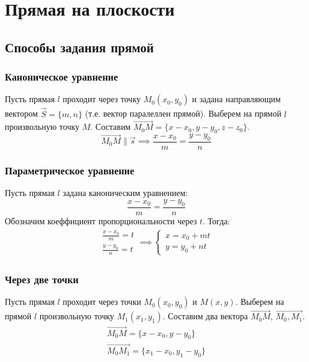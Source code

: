 \section{Прямая на плоскости}

\subsection{Способы задания прямой}

\subsubsection{Каноническое уравнение}

Пусть прямая $l$ проходит через точку $M_0(x_0, y_0)$ и задана направляющим вектором $\vec{S} = \{m, n\}$ (т.е. вектор паралеллен прямой). Выберем на прямой $l$ произвольную точку $M$.
Составим $\overrightarrow{M_0M} = \{x - x_0, y - y_0, z - z_0\}$. 
\[
  \overrightarrow{M_0M} \parallel \vec{s} \implies \boxed{\frac{x - x_0}{m} = \frac{y - y_0}{n}}
\]

\subsubsection{Параметрическое уравнение}

Пусть прямая $l$ задана каноническим уравнением: \[
\frac{x - x_0}{m} = \frac{y - y_0}{n}
\] 
Обозначим коеффициент пропорциональности через $t$. Тогда:
\begin{gather*}
  \begin{matrix}
    \frac{x - x_0}{m} = t \\
    \frac{y - y_0}{n} = t
  \end{matrix} \implies \boxed{\begin{cases}
    x = x_0 + mt \\
    y = y_0 + nt
  \end{cases}}
\end{gather*}
 
\subsubsection{Через две точки}

Пусть прямая $l$ проходит через точки $M_0(x_0, y_0)$ и $M(x, y)$. Выберем на прямой $l$ произвольную точку $M_1(x_1, y_1)$. Составим два вектора $\overrightarrow{M_0M}$, $\overrightarrow{M_0, M_1}$.
\begin{gather*}
  \overrightarrow{M_0M} = \{x - x_0, y - y_0\} \\
  \overrightarrow{M_0M_1} = \{x_1 - x_0, y_1 - y_0\}
\end{gather*}

